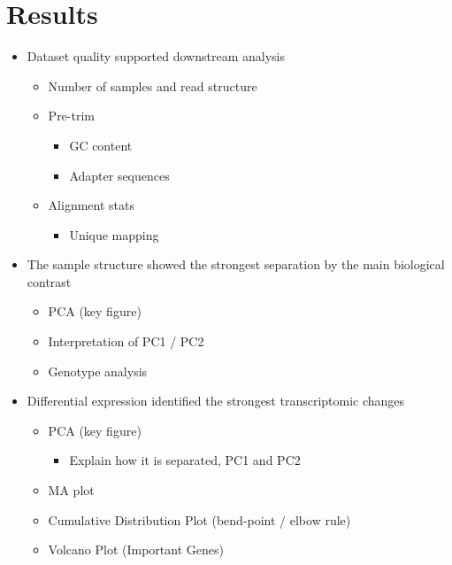 \documentclass[12pt]{article}
\begin{document}
\section*{\textcolor{samcolor}{Results}}
\begin{itemize}
\item \textcolor{samcolor}{Dataset quality supported downstream analysis}
\begin{itemize}
\item \textcolor{samcolor}{Number of samples and read structure}
\item \textcolor{samcolor}{Pre-trim}
\begin{itemize}
\item \textcolor{samcolor}{GC content}
\item \textcolor{samcolor}{Adapter sequences}
\end{itemize}
\item \textcolor{samcolor}{Alignment stats}
\begin{itemize}
\item \textcolor{samcolor}{Unique mapping}
\end{itemize}
\end{itemize}
\item \textcolor{pitercolor}{The sample structure showed the strongest separation by the main biological contrast}
\begin{itemize}
\item \textcolor{pitercolor}{PCA (key figure)}
\item \textcolor{pitercolor}{Interpretation of PC1 / PC2}
\item \textcolor{pitercolor}{Genotype analysis}
\end{itemize}
\item \textcolor{samcolor}{Differential expression identified the strongest transcriptomic changes}
\begin{itemize}
\item \textcolor{samcolor}{PCA (key figure)}
\begin{itemize}
\item \textcolor{samcolor}{Explain how it is separated, PC1 and PC2}
\end{itemize}
\item \textcolor{nikhicolor}{MA plot}
\item \textcolor{nikhicolor}{Cumulative Distribution Plot (bend-point / elbow rule)}
\item \textcolor{nikhicolor}{Volcano Plot (Important Genes)}
\begin{itemize}

\end{itemize}
\end{itemize}
\end{itemize}
\end{document}
